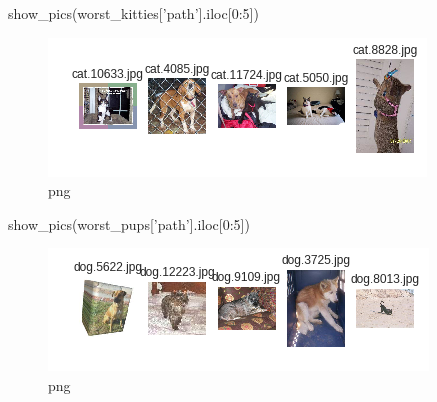 \documentclass[]{book}
\newenvironment{Shaded}{\begin{snugshade}}{\end{snugshade}}
\newcommand{\DecValTok}[1]{\textcolor[rgb]{0.00,0.00,0.81}{#1}}
\newcommand{\StringTok}[1]{\textcolor[rgb]{0.31,0.60,0.02}{#1}}
\newcommand{\NormalTok}[1]{#1}
\theoremstyle{definition}
\theoremstyle{definition}
\theoremstyle{definition}
\theoremstyle{remark}
\begin{document}
\begin{Shaded}
\begin{Highlighting}[]
\NormalTok{show_pics(worst_kitties[}\StringTok{'path'}\NormalTok{].iloc[}\DecValTok{0}\NormalTok{:}\DecValTok{5}\NormalTok{])}
\end{Highlighting}
\end{Shaded}

\begin{figure}
\centering
\includegraphics{CNTK-Transfer-Cats-Dogs_files/CNTK-Transfer-Cats-Dogs_64_0.png}
\caption{png}
\end{figure}

\begin{Shaded}
\begin{Highlighting}[]
\NormalTok{show_pics(worst_pups[}\StringTok{'path'}\NormalTok{].iloc[}\DecValTok{0}\NormalTok{:}\DecValTok{5}\NormalTok{])}
\end{Highlighting}
\end{Shaded}

\begin{figure}
\centering
\includegraphics{CNTK-Transfer-Cats-Dogs_files/CNTK-Transfer-Cats-Dogs_65_0.png}
\caption{png}
\end{figure}


\end{document}
